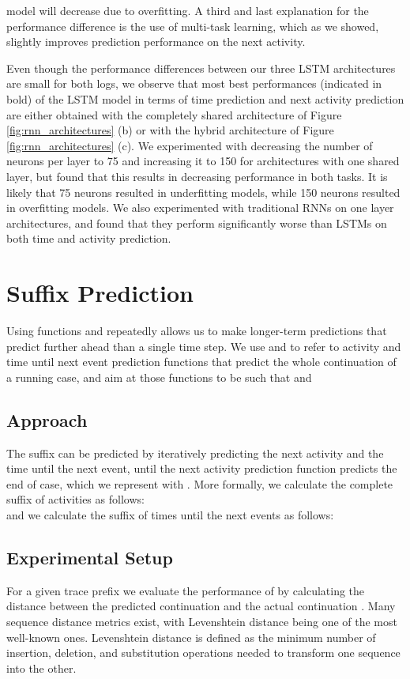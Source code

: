 \documentclass[runningheads,a4paper]{llncs}
\begin{document}
model will decrease due to overfitting. A third and last explanation for the performance difference is the use of multi-task learning, which as we showed, slightly improves prediction performance on the next activity.

Even though the performance differences between our three LSTM architectures are small for both logs, we observe that most best performances (indicated in bold) of the LSTM model in terms of time prediction and next activity prediction are either obtained with the completely shared architecture of Figure \ref{fig:rnn_architectures} (b) or with the hybrid architecture of Figure \ref{fig:rnn_architectures} (c). We experimented with decreasing the number of neurons per layer to 75 and increasing it to 150 for architectures with one shared layer, but found that this results in decreasing performance in both tasks. It is likely that 75 neurons resulted in underfitting models, while 150 neurons resulted in overfitting models. We also experimented with traditional RNNs on one layer architectures, and found that they perform significantly worse than LSTMs on both time and activity prediction. 
\section{Suffix Prediction}
\label{sec:full_suffix}
\enlargethispage{\baselineskip}
Using functions  and  repeatedly allows us to make longer-term predictions that predict further ahead than a single time step. We use  and  to refer to activity and time until next event prediction functions that predict the whole continuation of a running case, and aim at those functions to be such that  and 
\subsection{Approach}
The suffix can be predicted by iteratively predicting the next activity and the time until the next event, until the next activity prediction function  predicts the end of case, which we represent with . More formally, we calculate the complete suffix of activities as follows:\\


\noindent and we calculate the suffix of times until the next events as follows:\\

\noindent


\subsection{Experimental Setup}
For a given trace prefix  we evaluate the performance of  by calculating the distance between the predicted continuation  and the actual continuation . Many sequence distance metrics exist, with Levenshtein distance  being one of the most well-known ones. Levenshtein distance is defined as the minimum number of insertion, deletion, and substitution operations needed to transform one sequence into the other. 
\end{document}
